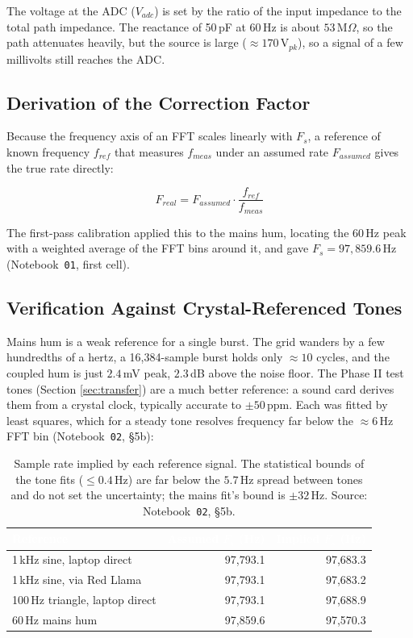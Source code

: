 \documentclass[11pt, a4paper]{report}
\begin{document}
The voltage at the ADC ($V_{adc}$) is set by the ratio of the input impedance to the total path impedance. The reactance of 50\,pF at 60\,Hz is about $53\,\text{M}\Omega$, so the path attenuates heavily, but the source is large ($\approx 170\,\text{V}_{pk}$), so a signal of a few millivolts still reaches the ADC.

\subsection{Derivation of the Correction Factor}
Because the frequency axis of an FFT scales linearly with $F_s$, a reference of known frequency $f_{ref}$ that measures $f_{meas}$ under an assumed rate $F_{assumed}$ gives the true rate directly:

\begin{equation}
  F_{real} = F_{assumed} \cdot \frac{f_{ref}}{f_{meas}}
\end{equation}

The first-pass calibration applied this to the mains hum, locating the 60\,Hz peak with a weighted average of the FFT bins around it, and gave $F_s = 97{,}859.6$\,Hz (Notebook~\texttt{01}, first cell).

\subsection{Verification Against Crystal-Referenced Tones}
Mains hum is a weak reference for a single burst. The grid wanders by a few hundredths of a hertz, a 16,384-sample burst holds only $\approx 10$ cycles, and the coupled hum is just $2.4$\,mV peak, $2.3$\,dB above the noise floor. The Phase II test tones (Section \ref{sec:transfer}) are a much better reference: a sound card derives them from a crystal clock, typically accurate to $\pm 50$\,ppm. Each was fitted by least squares, which for a steady tone resolves frequency far below the $\approx 6$\,Hz FFT bin (Notebook~\texttt{02}, \S5b):

\begin{table}[htbp]
  \centering
  \small\sffamily
  \renewcommand{\arraystretch}{1.3}
  \begin{tabular}{@{} l r r @{}}
    \toprule
    \rowcolor{TableHeader}
    \textbf{\textcolor{white}{Reference}} &
    \textbf{\textcolor{white}{Assumed $F_s$ (Hz)}} &
    \textbf{\textcolor{white}{Implied $F_s$ (Hz)}} \\
    \midrule
    1\,kHz sine, laptop direct      & 97,793.1 & 97,683.3 \\
    1\,kHz sine, via Red Llama      & 97,793.1 & 97,683.2 \\
    100\,Hz triangle, laptop direct & 97,793.1 & 97,688.9 \\
    60\,Hz mains hum                & 97,859.6 & 97,570.3 \\
    \bottomrule
  \end{tabular}
  \caption{Sample rate implied by each reference signal. The statistical bounds of the tone fits ($\le 0.4$\,Hz) are far below the $5.7$\,Hz spread between tones and do not set the uncertainty; the mains fit's bound is $\pm 32$\,Hz. Source: Notebook~\texttt{02}, \S5b.}
  \label{tab:fs}
\end{table}
\end{document}
